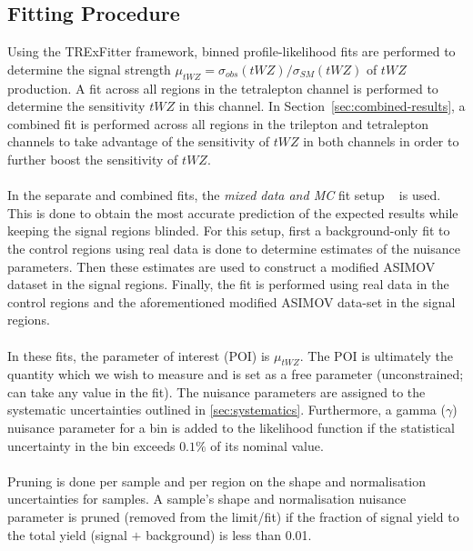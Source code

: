 \subsection{Fitting Procedure}
\label{sec:fitting-procedure}
Using the TRExFitter framework, binned profile-likelihood fits are performed to determine the signal strength $\mu_{tWZ} = \sigma_{obs}(tWZ)/\sigma_{SM}(tWZ)$ of $tWZ$ production. A fit across all regions in the tetralepton channel is performed to determine the sensitivity $tWZ$ in this channel. In Section~\ref{sec:combined-results}, a combined fit is performed across all regions in the trilepton and tetralepton channels to take advantage of the sensitivity of $tWZ$ in both channels in order to further boost the sensitivity of $tWZ$.\\\\

In the separate and combined fits, the \textit{mixed data and MC} fit setup ~\cite{MixedDataAndMC_TRF} is used. This is done to obtain the most accurate prediction of the expected results while keeping the signal regions blinded. For this setup, first a background-only fit to the control regions using real data is done to determine estimates of the nuisance parameters. Then these estimates are used to construct a modified ASIMOV dataset in the signal regions. Finally, the fit is performed using real data in the control regions and the aforementioned modified ASIMOV data-set in the signal regions.\\\\

In these fits, the parameter of interest (POI) is $\mu_{tWZ}$. The POI is ultimately the quantity which we wish to measure and is set as a free parameter (unconstrained; can take any value in the fit). The nuisance parameters are assigned to the systematic uncertainties outlined in \ref{sec:systematics}. Furthermore, a gamma ($\gamma$) nuisance parameter for a bin is added to the likelihood function if the statistical uncertainty in the bin exceeds $0.1\%$ of its nominal value.\\\\

Pruning is done per sample and per region on the shape and normalisation uncertainties for samples. A sample's shape and normalisation nuisance parameter is pruned (removed from the limit/fit) if the fraction of signal yield to the total yield (signal $+$ background) is less than 0.01.\\\\

